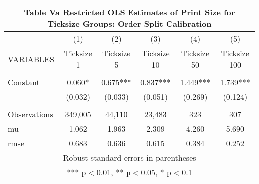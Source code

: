 \documentclass[]{article}
\begin{document}
\begin{tabular}{lccccc}
\multicolumn{6}{c}{Table Va Restricted OLS Estimates of Print Size for Ticksize Groups: Order Split Calibration} \\ \hline
 & (1) & (2) & (3) & (4) & (5) \\
VARIABLES & Ticksize 1 & Ticksize 5 & Ticksize 10 & Ticksize 50 & Ticksize 100 \\ \hline
 &  &  &  &  &  \\
Constant & 0.060* & 0.675*** & 0.837*** & 1.449*** & 1.739*** \\
 & (0.032) & (0.033) & (0.051) & (0.269) & (0.124) \\
 &  &  &  &  &  \\
Observations & 349,005 & 44,110 & 23,483 & 323 & 307 \\
mu & 1.062 & 1.963 & 2.309 & 4.260 & 5.690 \\
 rmse & 0.683 & 0.636 & 0.615 & 0.384 & 0.252 \\ \hline
\multicolumn{6}{c}{ Robust standard errors in parentheses} \\
\multicolumn{6}{c}{ *** p$<$0.01, ** p$<$0.05, * p$<$0.1} \\
\end{tabular}
\end{document}
